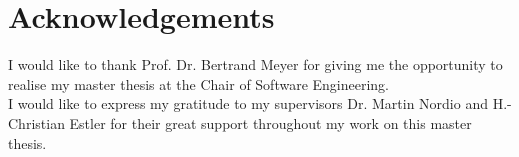 


\chapter*{Acknowledgements}

I would like to thank Prof. Dr. Bertrand Meyer for giving me the opportunity to realise my master thesis at the Chair of Software Engineering. \\

I would like to express my gratitude to my supervisors Dr. Martin Nordio and H.-Christian Estler for their great support throughout my work on this master thesis.



